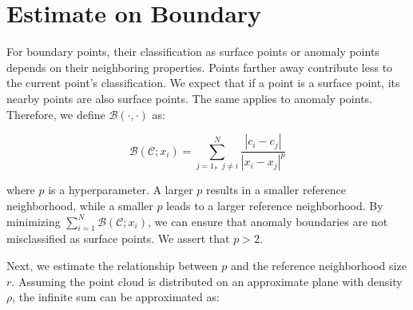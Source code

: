 






\section{Estimate on Boundary}
For boundary points, their classification as surface points or anomaly points depends on their neighboring properties. Points farther away contribute less to the current point's classification. We expect that if a point is a surface point, its nearby points are also surface points. The same applies to anomaly points. Therefore, we define $\mathcal{B}(\cdot,\cdot)$ as:

\begin{equation}
\mathcal{B}(\mathcal{C}; x_i) = \sum\limits_{j=1，j\neq i}^N \frac{|c_i-c_j|}{|x_i-x_j|^p}
\end{equation}

where $p$ is a hyperparameter. A larger $p$ results in a smaller reference neighborhood, while a smaller $p$ leads to a larger reference neighborhood. By minimizing $\sum\limits_{i=1}^N\mathcal{B}(\mathcal{C}; x_i)$, we can ensure that anomaly boundaries are not misclassified as surface points. We assert that $p>2$.

Next, we estimate the relationship between $p$ and the reference neighborhood size $r$. Assuming the point cloud is distributed on an approximate plane with density $\rho$, the infinite sum can be approximated as:

